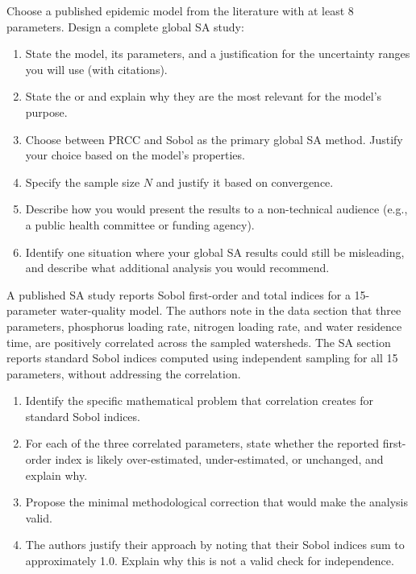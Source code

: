 \begin{exercise}[\bloom{L5}]
\label{ex:ch9:globaldesign}
Choose a published epidemic model from the literature with at least
8 parameters. Design a complete global SA study:
\begin{enumerate}[label=(\alph*)]
  \item State the model, its parameters, and a justification for the
        uncertainty ranges you will use (with citations).
  \item State the \QOI or \QOIs and explain why they are the most
        relevant for the model's purpose.
  \item Choose between PRCC and Sobol as the primary global SA method.
        Justify your choice based on the model's properties.
  \item Specify the sample size $N$ and justify it based on convergence.
  \item Describe how you would present the results to a non-technical
        audience (e.g., a public health committee or funding agency).
  \item Identify one situation where your global SA results could still
        be misleading, and describe what additional analysis you would
        recommend.
\end{enumerate}
\end{exercise}

\begin{exercise}[\bloom{L6}]
\label{ex:ch9:evaluation}
A published SA study reports Sobol first-order and total indices for
a 15-parameter water-quality model. The authors note in the data section
that three parameters, phosphorus loading rate, nitrogen loading rate,
and water residence time, are positively correlated across the sampled
watersheds. The SA section reports standard Sobol indices computed using
independent sampling for all 15 parameters, without addressing the
correlation.
\begin{enumerate}[label=(\alph*)]
  \item Identify the specific mathematical problem that correlation
        creates for standard Sobol indices.
  \item For each of the three correlated parameters, state whether the
        reported first-order index is likely over-estimated, under-estimated,
        or unchanged, and explain why.
  \item Propose the minimal methodological correction that would make
        the analysis valid.
  \item The authors justify their approach by noting that their Sobol
        indices sum to approximately 1.0. Explain why this is not
        a valid check for independence.
\end{enumerate}
\end{exercise}


